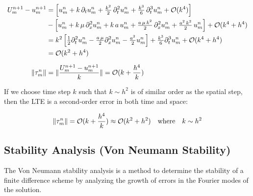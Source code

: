 \begin{align*}
  U_m^{n+1} - u_m^{n+1} & =
  \left[ u_m^n + k\,\partial_t u_m^n + \tfrac{k^2}{2}\,\partial_t^2 u_m^n + \tfrac{k^3}{6}\,\partial_t^3 u_m^n + \mathcal{O}(k^4) \right]                                                            \\
                        & - \left[ u_m^n + k\,\mu\,\partial_{x}^2 u_m^n + k\,a\,u_m^n + \tfrac{a\,\mu\,k^2}{2}\,\partial_{x}^2 u_m^n + \tfrac{a^2\,k^2}{2}\,u_m^n \right] + \mathcal{O}(k^4+h^4)     \\
                        & = k^2 \left[\tfrac{1}{2}\partial_t^2 u_m^n - \tfrac{a \,\mu}{2}\partial_{x}^2 u_m^n - \tfrac{a^2}{2}u_m^n\right] + \tfrac{k^3}{6}\partial_t^3 u_m^n + \mathcal{O}(k^4+h^4) \\
                        & = \mathcal{O}(k^2 + h^4)                                                                                                                                                   \\[2mm]
  \lVert\tau_m^n\rVert       & = \lVert\frac{U_m^{n+1} - u_m^{n+1}}{k}\rVert = \mathcal{O}(k + \frac{h^4}{k})                                                                                                  \\
\end{align*}

If we choose time step \(k\) such that \(k \sim h^2\) is of similar order as the spatial step, then the LTE is a second-order error in both time and space:

\begin{equation}
  \lVert\tau_m^n\rVert = \mathcal{O}(k + \frac{h^4}{k}) \approx \mathcal{O}(k^2 + h^2) \quad \text{where} \quad k \sim h^2
\end{equation}

\subsection{Stability Analysis (Von Neumann Stability)}
The Von Neumann stability analysis is a method to determine the stability of a finite difference scheme by analyzing the growth of errors in the Fourier modes of the solution.

